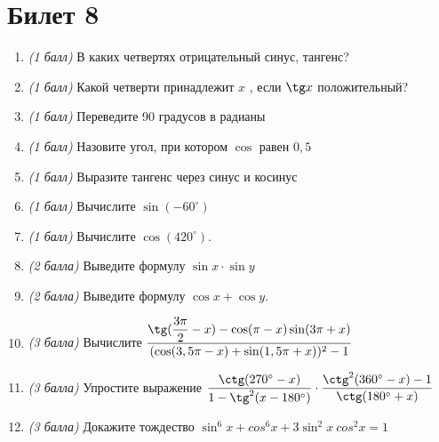 \documentclass[12pt, a4paper]{article}
\begin{document}
\section*{Билет 8}
\begin{enumerate}
\item \textit{(1 балл)}	В каких четвертях отрицательный синус, тангенс?
\item \textit{(1 балл)}	Какой четверти принадлежит $x$ , если $\tg x$ положительный?
\item \textit{(1 балл)}	Переведите 90 градусов в радианы
\item \textit{(1 балл)}	Назовите угол, при котором $\cos$  равен $0,5$
\item \textit{(1 балл)} Выразите тангенс через синус и косинус
\item \textit{(1 балл)} Вычислите $\sin (-60^{\circ})$
\item \textit{(1 балл)}	Вычислите $\cos (420^{\circ})$.
\item \textit{(2 балла)} Выведите формулу $\sin x \cdot \sin y$ 
\item \textit{(2 балла)} Выведите формулу $\cos x + \cos y$.
\item \textit{(3 балла)} Вычислите $\dfrac{\tg (\dfrac{3\pi}{2}-x)-\cos(\pi - x) \sin(3\pi + x)}{(\cos(3,5\pi - x)+ \sin (1,5 \pi + x))^2-1}$
\item \textit{(3 балла)} Упростите выражение $\dfrac{\ctg(270^{\circ}-x)}{1-\tg^2(x-180^{\circ})} \cdot \dfrac{\ctg^2(360^{\circ}-x)-1}{\ctg(180^{\circ}+x)}$
\item \textit{(3 балла)} Докажите тождество $\sin^6x + cos^6x + 3\sin^2x \ cos^2x = 1$
\end{enumerate}

\newpage 
\end{document}
